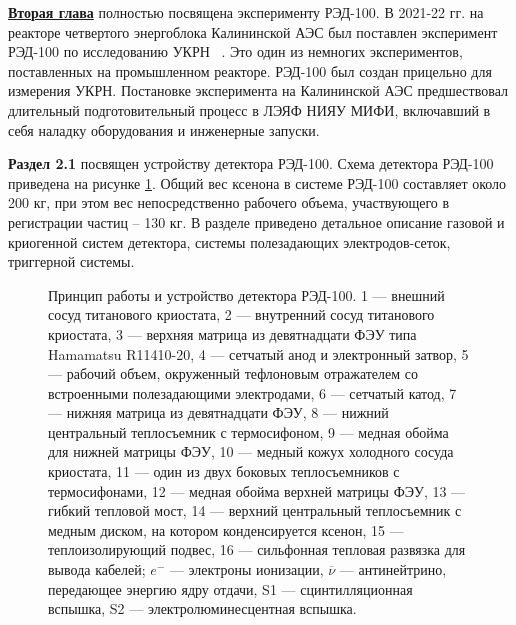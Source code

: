 \underline{\textbf{Вторая глава}} полностью посвящена эксперименту РЭД-100. В 2021-22 гг. на реакторе четвертого энергоблока Калининской АЭС был поставлен эксперимент РЭД-100 по исследованию УКРН ~\cite{The_RED100_Experiment}. Это один из немногих экспериментов, поставленных на промышленном реакторе. РЭД-100 был создан прицельно для измерения УКРН. Постановке эксперимента на Калининской АЭС предшествовал длительный подготовительный процесс в ЛЭЯФ НИЯУ МИФИ, включавший в себя наладку оборудования и инженерные запуски. 

\textbf{Раздел 2.1} посвящен устройству детектора РЭД-100. Схема детектора РЭД-100 приведена на рисунке \ref{img:detscheme}. Общий вес ксенона в системе РЭД-100 составляет около 200 кг, при этом вес непосредственно рабочего объема, участвующего в регистрации частиц -- 130 кг. В разделе приведено детальное описание газовой и криогенной систем детектора, системы полезадающих электродов-сеток, триггерной системы. 

\begin{figure}[ht!]	
	\caption[Принцип работы и устройство детектора РЭД-100] {Принцип работы и устройство детектора РЭД-100. 1 --- внешний сосуд титанового криостата, 2 --- внутренний сосуд титанового криостата, 3 --- верхняя матрица из девятнадцати ФЭУ типа Hamamatsu R11410-20, 4 --- сетчатый анод и электронный затвор, 5 --- рабочий объем, окруженный тефлоновым отражателем со встроенными полезадающими электродами, 6 --- сетчатый катод, 7 --- нижняя матрица из девятнадцати ФЭУ, 8 --- нижний центральный теплосъемник с термосифоном, 9 --- медная обойма для нижней матрицы ФЭУ, 10 --- медный кожух холодного сосуда криостата, 11 --- один из двух боковых теплосъемников с термосифонами, 12 --- медная обойма верхней матрицы ФЭУ, 13 --- гибкий тепловой мост, 14 --- верхний центральный теплосъемник с медным диском, на котором конденсируется ксенон, 15 --- теплоизолирующий подвес, 16 --- сильфонная тепловая развязка для вывода кабелей; $e^-$ --- электроны ионизации, $\overline{\nu}$ --- антинейтрино, передающее энергию ядру отдачи, S1 --- сцинтилляционная вспышка, S2 --- электролюминесцентная вспышка.}
	\label{img:detscheme}
\end{figure}

